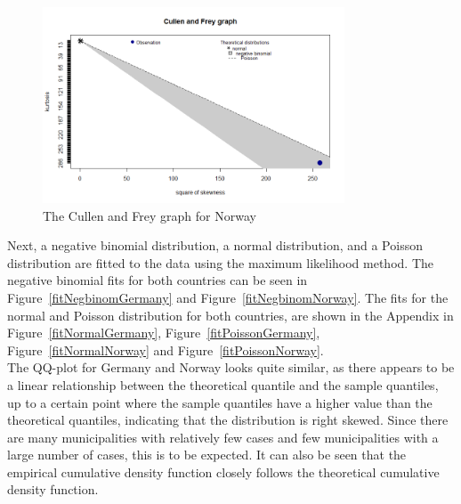 %     
\begin{figure}[H]
    \centering
    \includegraphics[width = 0.8\textwidth]{cf_norge.png}
    \caption{The Cullen and Frey graph for Norway}
    \label{cf_norge}
\end{figure}
Next, a negative binomial distribution, a normal distribution, and a Poisson distribution are fitted to the data using the maximum likelihood method. The negative binomial fits for both countries can be seen in Figure~\ref{fitNegbinomGermany} and Figure~\ref{fitNegbinomNorway}. The fits for the normal and Poisson distribution for both countries, are shown in the Appendix in Figure~\ref{fitNormalGermany}, Figure~\ref{fitPoissonGermany}, Figure~\ref{fitNormalNorway} and Figure~\ref{fitPoissonNorway}. \\
The QQ-plot for Germany and Norway looks quite similar, as there appears to be a linear relationship between the theoretical quantile and the sample quantiles, up to a certain point where the sample quantiles have a higher value than the theoretical quantiles, indicating that the distribution is right skewed. Since there are many municipalities with relatively few cases and few municipalities with a large number of cases, this is to be expected. It can also be seen that the empirical cumulative density function closely follows the theoretical cumulative density function.
%     
